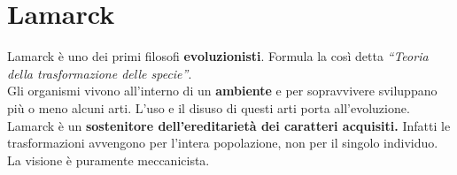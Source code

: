 
\section{Lamarck}
Lamarck è uno dei primi filosofi \textbf{evoluzionisti}. Formula la così detta \textit{``Teoria della
trasformazione delle specie''}.\\
Gli organismi vivono all'interno di un \textbf{ambiente} e per sopravvivere sviluppano più o meno
alcuni arti. L'uso e il disuso di questi arti porta all'evoluzione. Lamarck è un \textbf{sostenitore
dell'ereditarietà dei caratteri acquisiti.} Infatti le trasformazioni avvengono per l'intera
popolazione, non per il singolo individuo. La visione è puramente meccanicista.
